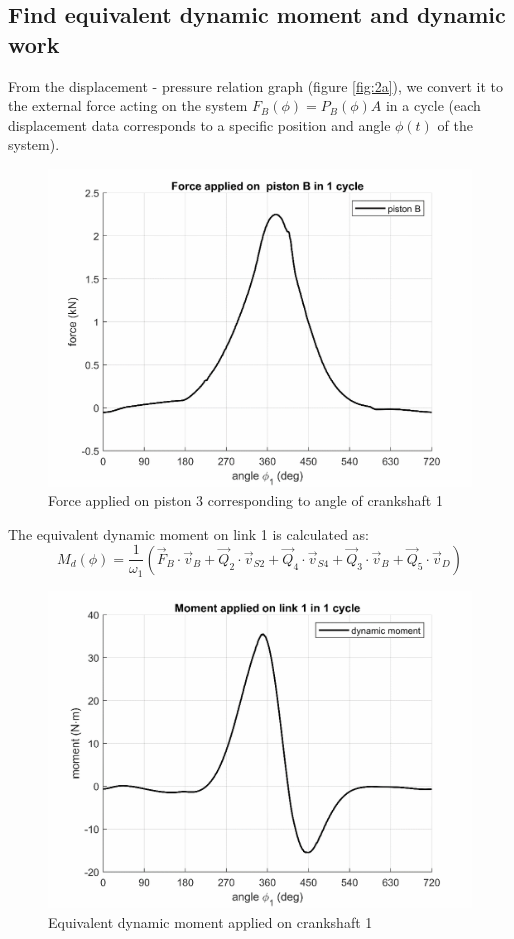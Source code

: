 \subsection{Find equivalent dynamic moment and dynamic work}
From the displacement - pressure relation graph (figure \ref{fig:2a}), we convert it to the external force acting on the system $ F_B(\phi)=P_B(\phi) A $ in a cycle (each displacement data corresponds to a specific position and angle $ \phi(t) $ of the system).
\begin{figure}[h]
	\centering
	\includegraphics{11}
	\caption{Force applied on piston 3 corresponding to angle of crankshaft 1}
	\label{fig:11}
\end{figure}

The equivalent dynamic moment on link 1 is calculated as:
\begin{equation}
	M_d(\phi)=\dfrac{1}{\omega_1}\left(\vec{F}_B\cdot\vec{v}_B+\vec{Q}_2\cdot\vec{v}_{S2}+\vec{Q}_4\cdot\vec{v}_{S4}+\vec{Q}_3\cdot\vec{v}_{B}+\vec{Q}_5\cdot\vec{v}_{D}\right)
\end{equation}
\begin{figure}[h]
	\centering
	\includegraphics[width=0.6\linewidth]{13}
	\caption{Equivalent dynamic moment applied on crankshaft 1}
	\label{fig:13}
\end{figure}

